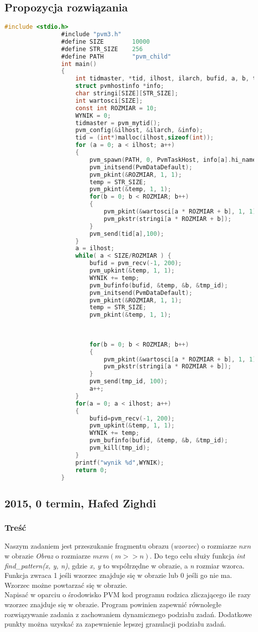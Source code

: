 		\subsection{Propozycja rozwiązania}
			\begin{lstlisting}[language=C]
				#include <stdio.h>
				#include "pvm3.h"
				#define SIZE        10000
				#define STR_SIZE    256
				#define PATH        "pvm_child"
				int main()
				{
					int tidmaster, *tid, ilhost, ilarch, bufid, a, b, temp, wynik;
					struct pvmhostinfo *info;
					char stringi[SIZE][STR_SIZE];
					int wartosci[SIZE];
					const int ROZMIAR = 10;
					WYNIK = 0;
					tidmaster = pvm_mytid();
					pvm_config(&ilhost, &ilarch, &info);
					tid = (int*)malloc(ilhost,sizeof(int));
					for (a = 0; a < ilhost; a++)
					{
						pvm_spawn(PATH, 0, PvmTaskHost, info[a].hi_name, 1, &tid[a]);
						pvm_initsend(PvmDataDefault);
						pvm_pkint(&ROZMIAR, 1, 1);
						temp = STR_SIZE;
						pvm_pkint(&temp, 1, 1);
						for(b = 0; b < ROZMIAR; b++)
						{
							pvm_pkint(&wartosci[a * ROZMIAR + b], 1, 1);
							pvm_pkstr(stringi[a * ROZMIAR + b]);
						}
						pvm_send(tid[a],100);
					}
					a = ilhost;
					while( a < SIZE/ROZMIAR ) {
						bufid = pvm_recv(-1, 200);
						pvm_upkint(&temp, 1, 1);
						WYNIK += temp;
						pvm_bufinfo(bufid, &temp, &b, &tmp_id);
						pvm_initsend(PvmDataDefault);
						pvm_pkint(&ROZMIAR, 1, 1);
						temp = STR_SIZE;
						pvm_pkint(&temp, 1, 1);
						
						
						
						for(b = 0; b < ROZMIAR; b++)
						{
							pvm_pkint(&wartosci[a * ROZMIAR + b], 1, 1);
							pvm_pkstr(stringi[a * ROZMIAR + b]);
						}
						pvm_send(tmp_id, 100);
						a++;
					}
					for(a = 0; a < ilhost; a++)
					{
						bufid=pvm_recv(-1, 200);
						pvm_upkint(&temp, 1, 1);
						WYNIK += temp;
						pvm_bufinfo(bufid, &temp, &b, &tmp_id);
						pvm_kill(tmp_id);
					}
					printf("wynik %d",WYNIK);
					return 0;
				}
			\end{lstlisting}
		\newpage
		
		\subsection{2015, 0 termin, Hafed Zighdi}
			\subsubsection{Treść}
				Naszym zadaniem jest przeszukanie fragmentu obrazu (\textit{wzorzec}) o rozmiarze $ nxn $ w obrazie 	\textit{Obraz} o rozmiarze $ mxm (m>>n) $. 
				Do tego celu służy funkcja \textit{int find\_pattern(x, y, n)}, gdzie \textit{x, y} to współrzędne w obrazie, a \textit{n} rozmiar wzorca. 
				Funkcja zwraca 1 jeśli wzorzec znajduje się w obrazie lub 0 jeśli go nie ma. Wzorzec możne powtarzać się w obrazie. \\
				Napisać w oparciu o środowisko PVM kod programu rodzica zliczającego ile razy wzorzec znajduje się w obrazie. Program powinien zapewnić równoległe rozwiązywanie zadania z zachowaniem dynamicznego podziału zadań. Dodatkowe punkty można uzyskać za zapewnienie lepszej granulacji podziału zadań.
